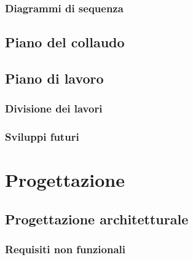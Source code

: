 \documentclass{article}
\begin{document}
\subsubsection{Diagrammi di sequenza}






\subsection{Piano del collaudo}


\subsection{Piano di lavoro}
\subsubsection{Divisione dei lavori}

\subsubsection{Sviluppi futuri}



\pagebreak
\section{Progettazione}

\subsection{Progettazione architetturale}
\subsubsection{Requisiti non funzionali}

\end{document}
